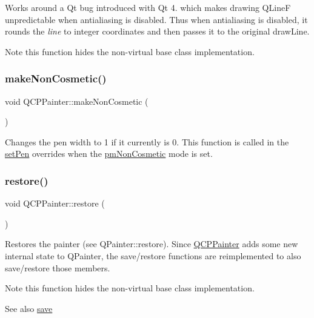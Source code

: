 Works around a Qt bug introduced with Qt 4. which makes drawing Q\+LineF unpredictable when antialiasing is disabled. Thus when antialiasing is disabled, it rounds the {\itshape line} to integer coordinates and then passes it to the original draw\+Line.

\begin{DoxyNote}{Note}
this function hides the non-\/virtual base class implementation. 
\end{DoxyNote}
\mbox{\label{class_q_c_p_painter_a7e63fbcf47e35c6f2ecd11b8fef7c7d8}} 
\subsubsection{\texorpdfstring{make\+Non\+Cosmetic()}{makeNonCosmetic()}}
{\footnotesize\ttfamily void Q\+C\+P\+Painter\+::make\+Non\+Cosmetic (\begin{DoxyParamCaption}{ }\end{DoxyParamCaption})}

Changes the pen width to 1 if it currently is 0. This function is called in the \mbox{\hyperlink{class_q_c_p_painter_af9c7a4cd1791403901f8c5b82a150195}{set\+Pen}} overrides when the \mbox{\hyperlink{class_q_c_p_painter_a156cf16444ff5e0d81a73c615fdb156dac1e481bfaf408f2bd2eaad3ec341f36b}{pm\+Non\+Cosmetic}} mode is set. \mbox{\label{class_q_c_p_painter_a64908e6298d5bbd83457dc987cc3a022}} 
\subsubsection{\texorpdfstring{restore()}{restore()}}
{\footnotesize\ttfamily void Q\+C\+P\+Painter\+::restore (\begin{DoxyParamCaption}{ }\end{DoxyParamCaption})}

Restores the painter (see Q\+Painter\+::restore). Since \mbox{\hyperlink{class_q_c_p_painter}{Q\+C\+P\+Painter}} adds some new internal state to Q\+Painter, the save/restore functions are reimplemented to also save/restore those members.

\begin{DoxyNote}{Note}
this function hides the non-\/virtual base class implementation.
\end{DoxyNote}
\begin{DoxySeeAlso}{See also}
\mbox{\hyperlink{class_q_c_p_painter_a8fd6821ee6fecbfa04444c9062912abd}{save}} 
\end{DoxySeeAlso}
\mbox{\label{class_q_c_p_painter_a8fd6821ee6fecbfa04444c9062912abd}} 
